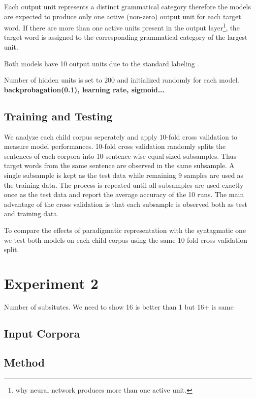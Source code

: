 Each output unit represents a distinct grammatical category therefore
the models are expected to produce only one active (non-zero) output
unit for each target word.  If there are more than one active units
present in the output layer\footnote{why neural network produces more
  than one active unit.}, the target word is assigned to the
corresponding grammatical category of the largest unit.

Both models have 10 output units due to the standard labeling
\citep*{Mintz200391}.

Number of hidden units is set to 200 and initialized randomly for each
model. {\bf backprobagation(0.1), learning rate, sigmoid...}

\subsection{Training and Testing}


We analyze each child corpus seperately and apply 10-fold cross
validation to measure model performances.  10-fold cross validation
randomly splits the sentences of each corpora into 10 sentence wise
equal sized subsamples.  Thus target words from the same sentence are
observed in the same subsample.  A single subsample is kept as the
test data while remaining 9 samples are used as the training data.
The process is repeated until all subsamples are used exactly once as
the test data and report the average accuracy of the 10 runs.  The
main advantage of the cross validation is that each subsample is
observed both as test and training data.

To compare the effects of paradigmatic representation with the
syntagmatic one we test both models on each child corpus using the
same 10-fold cross validation split.



\section{Experiment 2}
Number of subsitutes.  We need to show 16 is better than 1 but 16+ is same
\subsection{Input Corpora}
\subsection{Method}

